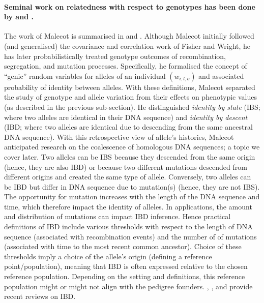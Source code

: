 \paragraph{Seminal work on relatedness with respect to genotypes has been
done by \cite{cotterman1940calculus} and
\cite{malecot1948mathematiques, malecot1969mathemathics}.}
%
The work of Malecot is summarised in
\cite{nagylaki1989gustave} and \cite{slatkin2002modern}.
%
Although Malecot initially followed (and generalised) the covariance and
correlation work of Fisher and Wright, he has later probabilistically
treated genotype outcomes of recombination, segregation, and mutation
processes.
%
Specifically, he formalised the concept of ``genic'' random variables
for alleles of an individual $(w_{i,l,o})$ and associated probability of
identity between alleles.
%
With these definitions, Malecot separated the study of genotype and
allele variation from their effects on phenotypic values
(as described in the previous sub-section).
%
He distinguished
\textit{identity by state} (IBS; where two alleles are identical in their
DNA sequence) and
\textit{identity by descent} (IBD; where two alleles are identical due to
descending from the same ancestral DNA sequence).
%
With this retrospective view of allele's histories, Malecot anticipated
research on the coalescence of homologous DNA sequences; a topic we
cover later.
%
Two alleles can be IBS because they descended from the same origin
(hence, they are also IBD)
or because two different mutations descended from different origins
and created the same type of allele.
%
Conversely, two alleles can be IBD but differ in DNA sequence due to
mutation(s) (hence, they are not IBS).
%
The opportunity for mutation increases with the length of the DNA sequence
and time, which therefore impact the identity of alleles.
%
In applications, the amount and distribution of mutations can impact IBD
inference.
%
Hence practical definitions of IBD include various thresholds
with respect to the length of DNA sequence (associated with recombination
events) and the number of of mutations (associated with time to the most
recent common ancestor).
%
Choice of these thresholds imply a choice of the allele's origin
(defining a reference point/population), meaning that IBD is often
expressed relative to the chosen reference population.
%
Depending on the setting and definitions, this reference population
might or might not align with the pedigree founders.
%
\cite{browning2012identity}, \cite{thompson2013identity}, and
\cite{wakeley2016coalescent} provide recent reviews on IBD.

